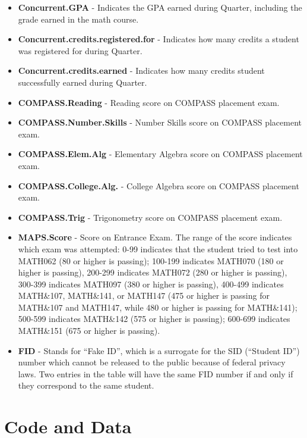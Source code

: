 \documentclass[twoside]{article}\usepackage[]{graphicx}\usepackage[]{color}
\begin{document}
\begin{itemize}
\item {\bf Concurrent.GPA} - Indicates the GPA earned during Quarter, including the grade earned in the math course.

\item {\bf Concurrent.credits.registered.for} - Indicates how many credits a student was registered for during Quarter.

\item {\bf Concurrent.credits.earned} - Indicates how many credits student successfully earned during Quarter.

\item {\bf COMPASS.Reading} - Reading score on COMPASS placement exam.

\item {\bf COMPASS.Number.Skills} - Number Skills score on COMPASS placement exam.

\item {\bf COMPASS.Elem.Alg} - Elementary Algebra score on COMPASS placement exam.

\item {\bf COMPASS.College.Alg.} - College Algebra score on COMPASS placement exam.

\item {\bf COMPASS.Trig} - Trigonometry score on COMPASS placement exam.

\item {\bf MAPS.Score} - Score on Entrance Exam.  The range of the score indicates which exam was attempted: 0-99 indicates that the student tried to test into MATH062 (80 or higher is passing); 100-199 indicates MATH070 (180 or higher is passing), 200-299 indicates MATH072 (280 or higher is passing), 300-399 indicates MATH097 (380 or higher is passing), 400-499 indicates MATH\&107, MATH\&141, or MATH147 (475 or higher is passing for MATH\&107 and MATH147, while 480 or higher is passing for MATH\&141); 500-599 indicates MATH\&142 (575 or higher is passing); 600-699 indicates MATH\&151 (675 or higher is passing).

\item {\bf FID} - Stands for ``Fake ID'', which is a surrogate for the SID (``Student ID'') number which cannot be released to the public because of federal privacy laws.  Two entries in the table will have the same FID number if and only if they correspond to the same student.
\end{itemize}






\section{Code and Data}
\end{document}
